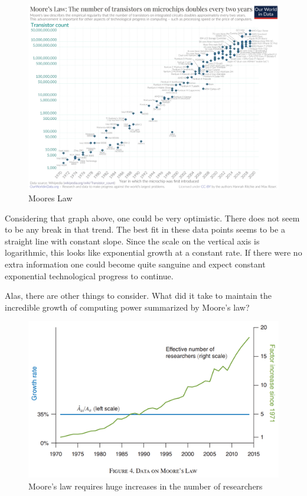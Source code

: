 \documentclass[
]{book}
\begin{document}
\begin{figure}

{\centering \includegraphics[width=1\linewidth]{img/growth/moore15} 

}

\caption{Moores Law}\label{fig:growth15}
\end{figure}

Considering that graph above, one could be very optimistic. There does not seem to be any break in that trend. The best fit in these data points seems to be a straight line with constant slope. Since the scale on the vertical axis is logarithmic, this looks like exponential growth at a constant rate. If there were no extra information one could become quite sanguine and expect constant exponential technological progress to continue.

Alas, there are other things to consider. What did it take to maintain the incredible growth of computing power summarized by Moore's law?

\begin{figure}

{\centering \includegraphics[width=1\linewidth]{img/growth/moore16} 

}

\caption{Moore’s law requires huge increases in the number of researchers}\label{fig:growth16}
\end{figure}
\end{document}
